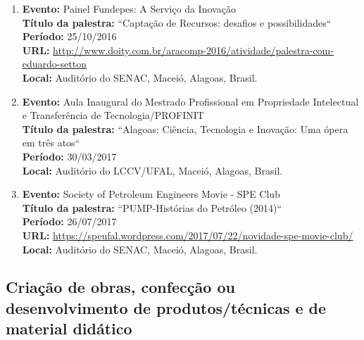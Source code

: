 \documentclass[a4paper,oneside,10pt]{article}
\begin{document}
\begin{enumerate}
\renewcommand{\labelenumi}{{\large\bfseries\arabic{enumi}.}}

 \item   \textbf{Evento:} Painel Fundepes: A Serviço da Inovação
  \mbox{} \\
        \textbf{Título da palestra:} ``Captação de Recursos: desafios e possibilidades``\\
        \textbf{Período:} 25/10/2016\\
        \textbf{URL:} \url{http://www.doity.com.br/aracomp-2016/atividade/palestra-com-eduardo-setton}\\
        \textbf{Local:} Auditório do SENAC, Maceió, Alagoas, Brasil.
      
 \item   \textbf{Evento:} Aula Inaugural do Mestrado Profissional em Propriedade Intelectual e Transferência de Tecnologia/PROFINIT 
   \mbox{} \\
        \textbf{Título da palestra:} ``Alagoas: Ciência, Tecnologia e Inovação: Uma ópera em três atos``\\
        \textbf{Período:} 30/03/2017\\
        \textbf{Local:} Auditório do LCCV/UFAL, Maceió, Alagoas, Brasil.
          
\item   \textbf{Evento:} Society of Petroleum Engineers Movie - SPE Club 
  \mbox{} \\
        \textbf{Título da palestra:} ``PUMP-Histórias do Petróleo (2014)``\\
        \textbf{Período:} 26/07/2017\\
        \textbf{URL:} \url{https://speufal.wordpress.com/2017/07/22/novidade-spe-movie-club/}\\
        \textbf{Local:} Auditório do SENAC, Maceió, Alagoas, Brasil.
       
  \end{enumerate}      
        


\newpage
\subsection{Criação de obras, confecção ou desenvolvimento de produtos/técnicas e de material didático}
\vspace{0.3cm}
\end{document}
